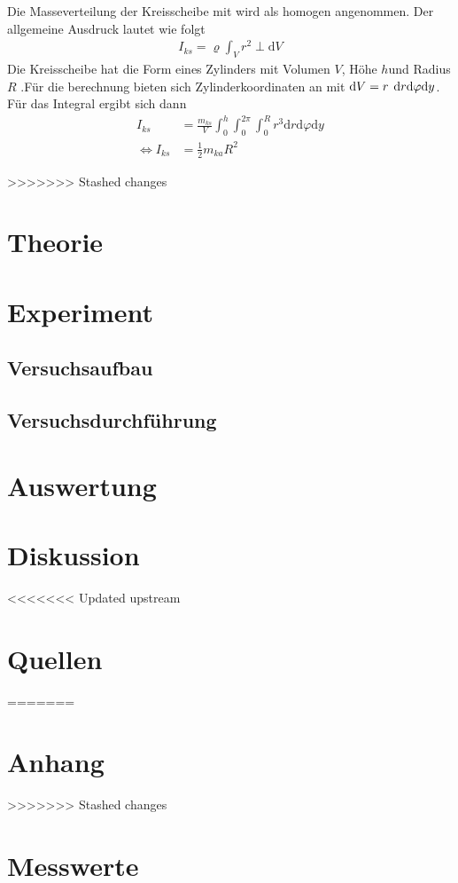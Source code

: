 \documentclass[11pt,a4paper]{article}
\begin{document}
Die Masseverteilung der Kreisscheibe mit wird als homogen angenommen. Der allgemeine Ausdruck lautet wie folgt
\begin{align}
	I_{ks} = \varrho\int_{V}^{}r^2\perp\mathrm{d}V
\end{align}
Die Kreisscheibe hat die Form eines Zylinders mit Volumen $V $, Höhe $h$und Radius $R$ .Für die berechnung bieten sich Zylinderkoordinaten an mit $\mathrm{d}V=r\hspace{0.15cm}\mathrm{d}r\mathrm{d}\varphi\mathrm{d}y$.
Für das Integral ergibt sich dann
\begin{align}
	I_{ks} &= \frac{m_{ks}}{V} \int_{0}^{h}\int_{0}^{2\pi}\int_{0}^{R} r^3 \mathrm{d}r\mathrm{d}\varphi\mathrm{d}y \\
	\Leftrightarrow I_{ks} &= \frac{1}{2} m_{ka}R^2
\end{align}






>>>>>>> Stashed changes











\section{Theorie}

\section{Experiment}
\subsection{Versuchsaufbau}

\subsection{Versuchsdurchführung}

\section{Auswertung}

\section{Diskussion}



\newpage
<<<<<<< Updated upstream
\section{Quellen}
=======
\section{Anhang}
>>>>>>> Stashed changes
%

\nocite{*}
\newpage
\section{Messwerte}
\newpage
%
\end{document}
